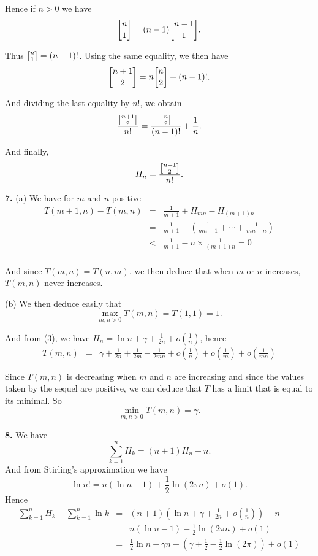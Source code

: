\documentclass[a4paper,12pt]{article}
\newcommand{\newpar}[1]{\bigskip \noindent \textbf{#1.}}
\newcommand{\subpar}[1]{\medskip \noindent (#1)}
\newcommand{\stirlingone}[2]{{#1 \atopwithdelims[]#2}}
\begin{document}
Hence if $n > 0$ we have
\[ \stirlingone{n}{1} = (n-1)\stirlingone{n-1}{1}.\]

Thus $\stirlingone{n}{1} = (n-1)!$.  Using the same equality, we then have
\[ \stirlingone{n+1}{2} = n\stirlingone{n}{2} + (n-1)!.\]

And dividing the  last equality by $n!$, we obtain
\[\frac{\stirlingone{n+1}{2}}{n!} = \frac{\stirlingone{n}{2}}{(n-1)!}
+ \frac{1}{n}.\]

And finally,
\[ H_n = \frac{\stirlingone{n+1}{2}}{n!}.\]

\newpar{7} \subpar{a} We have for $m$ and $n$ positive
\begin{eqnarray*}
  T(m+1, n) - T(m, n) &=& \frac{1}{m+1} + H_{mn} - H_{(m+1)n} \\
  &=& \frac{1}{m+1} - \left(\frac{1}{mn+1} + \cdots +
  \frac{1}{mn + n}\right) \\
  &<& \frac{1}{m+1} - n \times \frac{1}{(m+1)n} = 0\\
\end{eqnarray*}

And since $T(m, n) = T(n, m)$, we then deduce that when $m$ or $n$
increases, $T(m, n)$ never increases.

\subpar{b}  We then deduce easily that
\[\max_{m, n > 0} T(m, n) = T(1, 1) = 1.\]

And from (3), we have $H_n = \ln n + \gamma + \frac{1}{2n} +
o\left(\frac{1}{n}\right)$, hence
\begin{eqnarray*}
  T(m, n) &=& \gamma + \frac{1}{2n} + \frac{1}{2m} - \frac{1}{2mn} +
  o\left(\frac{1}{n}\right) + o\left(\frac{1}{m}\right) +
  o\left(\frac{1}{mn}\right)
\end{eqnarray*}

Since $T(m, n)$ is decreasing when $m$ and $n$ are increasing and
since the values taken by the sequel are positive, we can deduce that
$T$ has a limit that is equal to its minimal.  So
\[ \min_{m, n > 0} T(m, n) = \gamma.\]

\newpar{8} We have
\[  \sum_{k=1}^n H_k = (n + 1)H_n - n.\]
And from Stirling's approximation we have
\[ \ln n! = n(\ln n - 1) + \frac{1}{2}\ln(2\pi n) + o(1).\]
Hence
\begin{eqnarray*}
  \sum_{k=1}^n H_k - \sum_{k=1}^n \ln k &=& (n+1)\left(\ln n + \gamma
  + \frac{1}{2n} + o\left(\frac{1}{n}\right)\right)- n -\\ &&n(\ln n -
  1) - \frac{1}{2}\ln(2\pi n) + o(1)\\ &=& \frac{1}{2}\ln n + \gamma n
  + \left(\gamma + \frac{1}{2} - \frac{1}{2}\ln(2\pi)\right) + o(1)
\end{eqnarray*}
\end{document}
